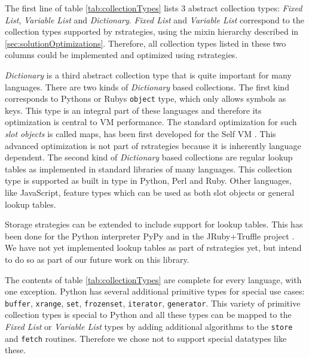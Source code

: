 The first line of table \ref{tab:collectionTypes} lists 3 abstract collection types: \emph{Fixed List}, \emph{Variable List} and \emph{Dictionary}.
\emph{Fixed List} and \emph{Variable List} correspond to the collection types supported by rstrategies, using the mixin hierarchy described in \ref{sec:solutionOptimizations}.
Therefore, all collection types listed in these two columns could be implemented and optimized using rstrategies.

\emph{Dictionary} is a third abstract collection type that is quite important for many languages.
There are two kinds of \emph{Dictionary} based collections.
The first kind corresponds to Pythons or Rubys \lstinline{object} type, which only allows symbols as keys.
This type is an integral part of these languages and therefore its optimization is central to VM performance.
The standard optimization for such \emph{slot objects} is called maps, has been first developed for the Self VM \cite{self, selfDissertation}.
This advanced optimization is not part of rstrategies because it is inherently language dependent.
The second kind of \emph{Dictionary} based collections are regular lookup tables as implemented in standard libraries of many languages.
This collection type is supported as built in type in Python, Perl and Ruby.
Other languages, like JavaScript, feature types which can be used as both slot objects or general lookup tables.

Storage strategies can be extended to include support for lookup tables.
This has been done for the Python interpreter PyPy \cite{strategies} and in the JRuby+Truffle project \cite{smallDataStructures}.
We have not yet implemented lookup tables as part of rstrategies yet, but intend to do so as part of our future work on this library.

The contents of table \ref{tab:collectionTypes} are complete for every language, with one exception.
Python has several additional primitive types for special use cases: \lstinline{buffer}, \lstinline{xrange}, \lstinline{set}, \lstinline{frozenset}, \lstinline{iterator}, \lstinline{generator}.
This variety of primitive collection types is special to Python and all these types can be mapped to the \emph{Fixed List} or \emph{Variable List} types by adding additional algorithms to the \lstinline{store} and \lstinline{fetch} routines.
Therefore we chose not to support special datatypes like these.


